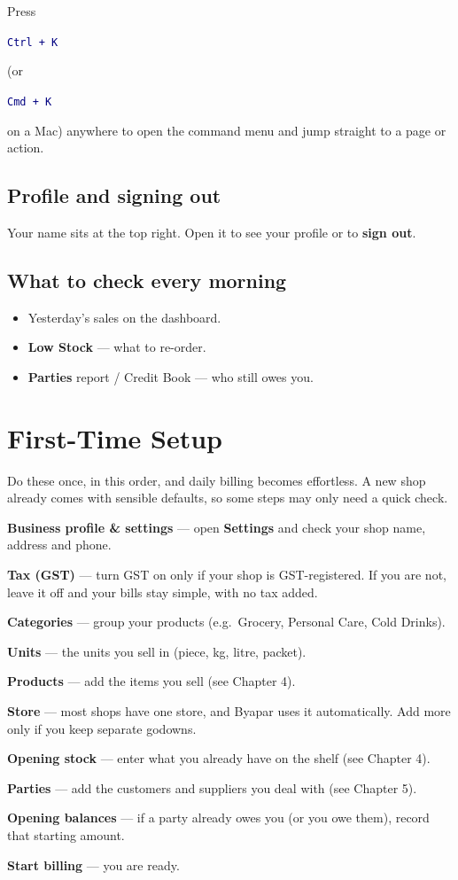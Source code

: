 \documentclass[11pt,a4paper,openany]{report}
\newcommand{\ui}[1]{\colorbox{panel}{\rule[-3pt]{0pt}{11pt}\texttt{\textcolor{navy}{#1}}}}
\begin{document}
\begin{tipbox}
Press \ui{Ctrl\,+\,K} (or \ui{Cmd\,+\,K} on a Mac) anywhere to open the command
menu and jump straight to a page or action.
\end{tipbox}

\section{Profile and signing out}
Your name sits at the top right. Open it to see your profile or to \textbf{sign out}.

\section{What to check every morning}
\begin{itemize}[leftmargin=1.3em,itemsep=2pt]
  \item Yesterday's sales on the dashboard.
  \item \textbf{Low Stock} — what to re-order.
  \item \textbf{Parties} report / Credit Book — who still owes you.
\end{itemize}

\chapter{First-Time Setup}
Do these once, in this order, and daily billing becomes effortless. A new shop
already comes with sensible defaults, so some steps may only need a quick check.

\begin{steps}
  \item \textbf{Business profile \& settings} — open \textbf{Settings} and check your shop name, address and phone.
  \item \textbf{Tax (GST)} — turn GST on only if your shop is GST-registered. If you are not, leave it off and your bills stay simple, with no tax added.
  \item \textbf{Categories} — group your products (e.g.\ Grocery, Personal Care, Cold Drinks).
  \item \textbf{Units} — the units you sell in (piece, kg, litre, packet).
  \item \textbf{Products} — add the items you sell (see Chapter 4).
  \item \textbf{Store} — most shops have one store, and Byapar uses it automatically. Add more only if you keep separate godowns.
  \item \textbf{Opening stock} — enter what you already have on the shelf (see Chapter 4).
  \item \textbf{Parties} — add the customers and suppliers you deal with (see Chapter 5).
  \item \textbf{Opening balances} — if a party already owes you (or you owe them), record that starting amount.
  \item \textbf{Start billing} — you are ready.
\end{steps}
\end{document}
